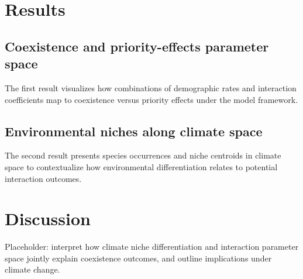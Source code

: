 \documentclass[12pt]{article}
\begin{document}
\section{Results}

\subsection{Coexistence and priority-effects parameter space}
The first result visualizes how combinations of demographic rates and interaction coefficients map to coexistence versus priority effects under the model framework.


\subsection{Environmental niches along climate space}
The second result presents species occurrences and niche centroids in climate space to contextualize how environmental differentiation relates to potential interaction outcomes.


\section{Discussion}
Placeholder: interpret how climate niche differentiation and interaction parameter space jointly explain coexistence outcomes, and outline implications under climate change.
\end{document}
